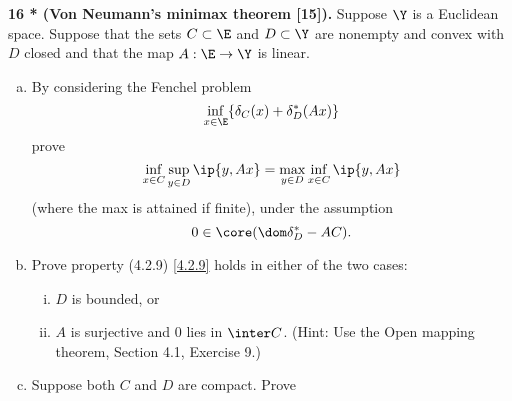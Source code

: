 \documentclass[../borwein-lewis_notes.tex]{subfiles}
\begin{document}
\noindent
\textbf{16 * (Von Neumann's minimax theorem [15]).} Suppose $\Y$ is a 
Euclidean space. Suppose that the sets $C\subset\E$ and $D\subset\Y$ 
are nonempty and convex with $D$ closed and that the map $A:\E\to\Y$ 
is linear.
\begin{enumerate}[(a)]
\item By considering the Fenchel problem 
\begin{equation*}
\inf_{x\in\E}\{\delta_C(x) + \delta_D^*(Ax)\}
\end{equation*}
prove 
\begin{equation*}
\inf_{x\in C}\sup_{y\in D}\ip{y, Ax} = \max_{y\in D}\inf_{x\in C}
\ip{y, Ax}
\end{equation*}
(where the max is attained if finite), under the assumption 
\begin{equation}
\label{4.2.9}
0\in\core(\dom \delta_D^*-AC).
\end{equation}
\item Prove property (4.2.9) \eqref{4.2.9} holds in either of the two cases:
\begin{enumerate}[(i)]
\item $D$ is bounded, or 
\item $A$ is surjective and 0 lies in $\inter C$. (Hint: Use the Open 
mapping theorem, Section 4.1, Exercise 9.)
\end{enumerate}
\item Suppose both $C$ and $D$ are compact. Prove 

\end{enumerate}
\end{document}
